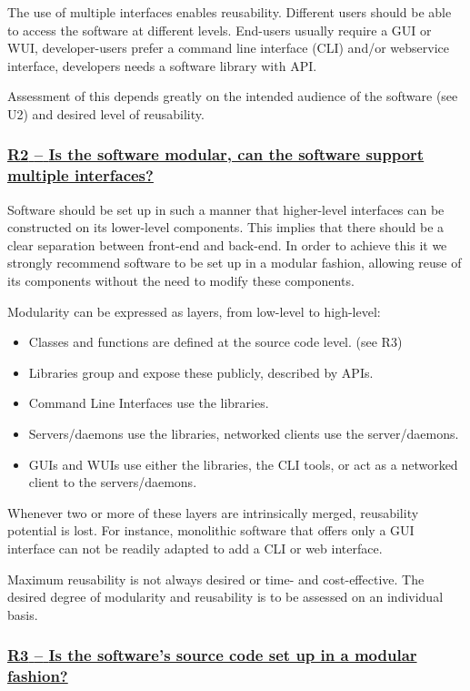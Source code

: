 \documentclass[a4paper,11pt]{article}
\newcommand{\criterion}[1]{\subsubsection*{\underline{#1}}}
\begin{document}
The use of multiple interfaces enables reusability. Different users should be
able to access the software at different levels. End-users usually require a
GUI or WUI, developer-users prefer a command line interface (CLI) and/or
webservice interface, developers needs a software library with API.

Assessment of this depends greatly on the intended audience of the software
(see U2) and desired level of reusability.

\newcommand{\rTwoID}{R2}
\newcommand{\rTwoText}{Is the software modular, can the software support multiple interfaces?}
\criterion{\rTwoID{ }--{ }\rTwoText}\label{id:r2} 

Software should be set up in such a manner that higher-level interfaces can be
constructed on its lower-level components. This implies that there should be a
clear separation between front-end and back-end. In order to achieve this it we
strongly recommend software to be set up in a modular fashion, allowing reuse
of its components without the need to modify these components.

Modularity can be expressed as layers, from low-level to high-level:

\begin{itemize}
 \item Classes and functions are defined at the source code level. (see R3)
 \item Libraries group and expose these publicly, described by APIs. 
 \item Command Line Interfaces use the libraries.
 \item Servers/daemons use the libraries, networked clients use the server/daemons.
 \item GUIs and WUIs use either the libraries, the CLI tools, or act as a networked client to the servers/daemons.
\end{itemize}

Whenever two or more of these layers are intrinsically merged, reusability potential is lost.
For instance, monolithic software that offers only a GUI interface can not be
readily adapted to add a CLI or web interface.

Maximum reusability is not always desired or time- and cost-effective. The
desired degree of modularity and reusability is to be assessed on an
individual basis.

\newcommand{\rThreeID}{R3}
\newcommand{\rThreeText}{Is the software's source code set up in a modular fashion?}
\criterion{\rThreeID{ }--{ }\rThreeText}\label{id:r3} 
%
%
%
\end{document}
